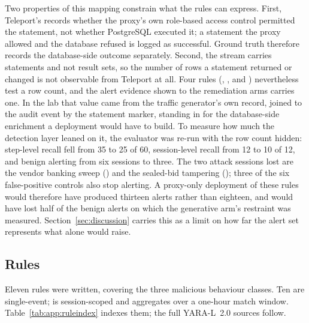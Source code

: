 Two properties of this mapping constrain what the rules can express. First,
Teleport's  records whether the proxy's own role-based access control
permitted the statement, not whether PostgreSQL executed it; a statement the proxy
allowed and the database refused is logged as successful. Ground truth therefore
records the database-side outcome separately. Second, the stream carries statements
and not result sets, so the number of rows a statement returned or changed is not
observable from Teleport at all. Four rules (, ,
 and ) nevertheless test a row count, and the
alert evidence shown to the remediation arms carries one. In the lab that value came
from the traffic generator's own record, joined to the audit event by the statement
marker, standing in for the database-side enrichment a deployment would have to
build. To measure how much the detection layer leaned on it, the evaluator was re-run
with the row count hidden: step-level recall fell from 35 to 25 of 60, session-level
recall from 12 to 10 of 12, and benign alerting from six sessions to three. The two
attack sessions lost are the vendor banking sweep () and the sealed-bid
tampering (); three of the six false-positive controls also stop
alerting. A proxy-only deployment of these rules would therefore have produced thirteen
alerts rather than eighteen, and would have lost half of the benign alerts on which the
generative arm's restraint was measured. Section~\ref{sec:discussion} carries this as a limit on how far
the alert set represents what \secops{} alone would raise.

\subsection{Rules}
\label{app:rules:list}

Eleven rules were written, covering the three malicious behaviour classes. Ten are
single-event;  is session-scoped and aggregates over a one-hour match
window. Table~\ref{tab:app:ruleindex} indexes them; the full YARA-L~2.0 sources follow.

